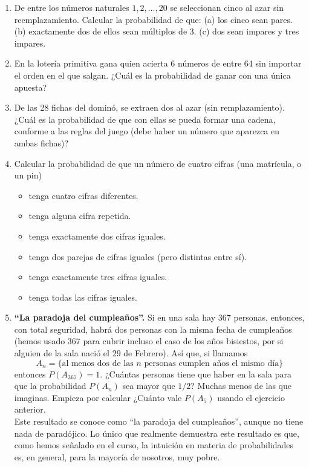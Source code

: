 \documentclass[10pt,a4paper]{article}\usepackage[]{graphicx}\usepackage[]{color}
\begin{document}
\begin{enumerate}
    \item De entre los números naturales $1,2,\ldots,20$ se seleccionan cinco al azar sin reemplazamiento. Calcular la probabilidad de que: (a) los cinco sean pares. (b) exactamente dos de ellos sean múltiplos de 3. (c) dos sean impares y tres impares.

    \item En la lotería primitiva gana quien acierta 6 números de entre 64 sin importar el orden en el que salgan. ¿Cuál es la probabilidad de ganar con una única apuesta?


    \item De las 28 fichas del dominó, se extraen dos al azar (sin remplazamiento). ¿Cuál es la probabilidad de que con ellas se pueda formar una cadena, conforme a las reglas del juego (debe haber un número que aparezca en ambas fichas)?

    \item Calcular la probabilidad de que un número de cuatro cifras (una matrícula, o un pin)
    \begin{itemize}
      \item tenga cuatro cifras diferentes.
      \item tenga alguna cifra repetida.
      \item tenga exactamente dos cifras iguales.
      \item tenga dos parejas de cifras iguales (pero distintas entre sí).
      \item tenga exactamente tres cifras iguales.
      \item tenga todas las cifras iguales.
    \end{itemize}


  \item {\bf ``La paradoja del cumpleaños''.} Si en una sala hay $367$ personas, entonces, con total seguridad, habrá dos personas con la misma fecha de cumpleaños (hemos usado $367$ para cubrir incluso el caso de los años bisiestos, por si alguien de la sala nació el $29$ de Febrero). Así que, si llamamos
      $$A_n= \{\mbox{al menos dos de las $n$ personas cumplen años el mismo día}\}$$
      entonces $P(A_{367})=1$. ¿Cuántas personas tiene que haber en la sala para que la probabilidad $P(A_{n})$ sea mayor que $1/2$? Muchas menos de las que imaginas. Empieza por calcular ¿Cuánto vale $P(A_{5})$ usando el ejercicio anterior.\\
      Este resultado se conoce como ``la paradoja del cumpleaños'', aunque no tiene nada de paradójico. Lo único que realmente demuestra este resultado es que, como hemos señalado en el curso, la intuición en materia de probabilidades es, en general, para la mayoría de nosotros, muy pobre.
\end{enumerate}
\end{document}

